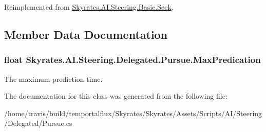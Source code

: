 Reimplemented from \hyperlink{class_skyrates_1_1_a_i_1_1_steering_1_1_basic_1_1_seek_a71808935baa1eb950feca8c380b157e0}{Skyrates.\-A\-I.\-Steering.\-Basic.\-Seek}.



\subsection{Member Data Documentation}
\hypertarget{class_skyrates_1_1_a_i_1_1_steering_1_1_delegated_1_1_pursue_a64f7f741d359c3174e28c7161d104b0c}{
\subsubsection[{Max\-Predication}]{\setlength{\rightskip}{0pt plus 5cm}float Skyrates.\-A\-I.\-Steering.\-Delegated.\-Pursue.\-Max\-Predication}}\label{class_skyrates_1_1_a_i_1_1_steering_1_1_delegated_1_1_pursue_a64f7f741d359c3174e28c7161d104b0c}


The maximum prediction time. 



The documentation for this class was generated from the following file\-:\begin{DoxyCompactItemize}
\item 
/home/travis/build/temportalflux/\-Skyrates/\-Skyrates/\-Assets/\-Scripts/\-A\-I/\-Steering/\-Delegated/Pursue.\-cs\end{DoxyCompactItemize}

